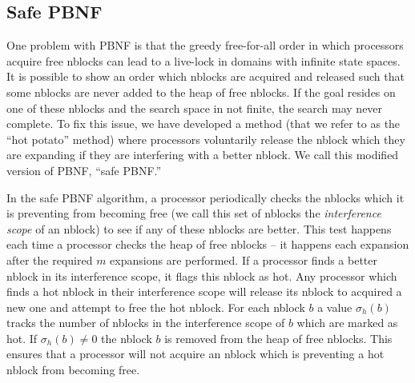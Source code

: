 \documentclass{article}
\begin{document}
 \subsection{Safe PBNF}

 One problem with PBNF is that the greedy free-for-all order in which
 processors acquire free nblocks can lead to a live-lock in domains
 with infinite state spaces.  It is possible to show an order which
 nblocks are acquired and released such that some nblocks are never
 added to the heap of free nblocks.  If the goal resides on one of
 these nblocks and the search space in not finite, the search may never
 complete.  To fix this issue, we have developed a method (that we
 refer to as the ``hot potato'' method) where processors voluntarily
 release the nblock which they are expanding if they are interfering
 with a better nblock.  We call this modified version of PBNF, ``safe
 PBNF.''

 In the safe PBNF algorithm, a processor periodically checks the
 nblocks which it is preventing from becoming free (we call this set of
 nblocks the \emph{interference scope} of an nblock) to see if any of
 these nblocks are better.  This test happens each time a processor
 checks the heap of free nblocks -- it happens each expansion after the
 required $m$ expansions are performed.  If a processor finds a better
 nblock in its interference scope, it flags this nblock as hot.  Any
 processor which finds a hot nblock in their interference scope will
 release its nblock to acquired a new one and attempt to free the hot
 nblock.  For each nblock $b$ a value $\sigma_h(b)$ tracks the number
 of nblocks in the interference scope of $b$ which are marked as hot.
 If $\sigma_h(b) \neq 0$ the nblock $b$ is removed from the heap of
 free nblocks.  This ensures that a processor will not acquire an
 nblock which is preventing a hot nblock from becoming free.
\end{document}
